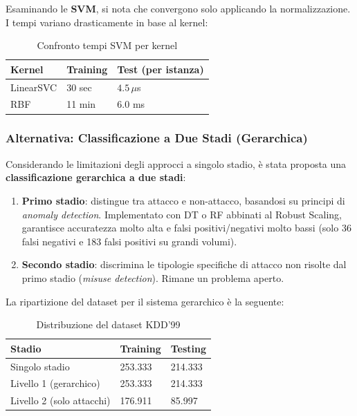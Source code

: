 Esaminando le \textbf{SVM}, si nota che convergono
solo applicando la normalizzazione. I tempi variano
drasticamente in base al kernel:

\begin{table}[h!]
\centering
\begin{tabular}{lll}
\toprule
\textbf{Kernel} &
\textbf{Training} &
\textbf{Test (per istanza)} \\
\midrule
LinearSVC &
30 sec &
$4.5\,\mu$s \\
RBF &
11 min &
$6.0$ ms \\
\bottomrule
\end{tabular}
\caption{Confronto tempi SVM per kernel}
\end{table}

\subsubsection{Alternativa: Classificazione a Due Stadi (Gerarchica)}

Considerando le limitazioni degli approcci a singolo
stadio, è stata proposta una
\textbf{classificazione gerarchica a due stadi}:

\begin{enumerate}
    \item \textbf{Primo stadio}: distingue tra attacco
        e non-attacco, basandosi su principi di
        \textit{anomaly detection}. Implementato con
        DT o RF abbinati al Robust Scaling, garantisce
        accuratezza molto alta e falsi positivi/negativi
        molto bassi (solo 36 falsi negativi e 183 falsi
        positivi su grandi volumi).
    \item \textbf{Secondo stadio}: discrimina le
        tipologie specifiche di attacco non risolte
        dal primo stadio (\textit{misuse detection}).
        Rimane un problema aperto.
\end{enumerate}

La ripartizione del dataset per il sistema gerarchico
è la seguente:

\begin{table}[h!]
\centering
\begin{tabular}{lll}
\toprule
\textbf{Stadio} &
\textbf{Training} &
\textbf{Testing} \\
\midrule
Singolo stadio &
253.333 &
214.333 \\
Livello 1 (gerarchico) &
253.333 &
214.333 \\
Livello 2 (solo attacchi) &
176.911 &
85.997 \\
\bottomrule
\end{tabular}
\caption{Distribuzione del dataset KDD'99}
\end{table}

